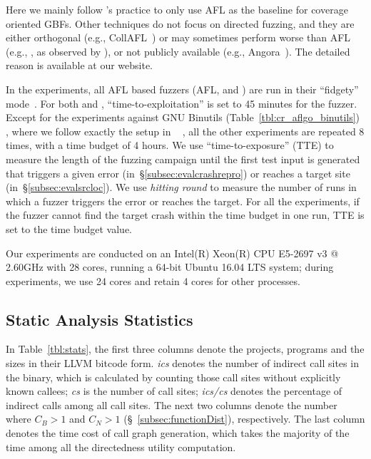 Here we mainly follow \aflgo's practice to only use AFL as the baseline for coverage oriented GBFs. Other techniques do not focus on directed fuzzing, and they are either orthogonal (e.g., CollAFL~\cite{CollAFL}) or may sometimes perform worse than AFL (e.g., \aflfast, as observed by \cite{Shastry:LNCS2017:Orthrus}), or not publicly available (e.g., Angora~\cite{Angora}). The detailed reason is available at our website. %

In the experiments, all AFL based fuzzers (AFL, {\aflgo} and {\dGO}) are run in their ``fidgety'' mode~\cite{FidgetyAFL}. For both {\aflgo} and {\dGO}, ``time-to-exploitation'' is set to 45 minutes for the fuzzer. Except for the experiments against GNU Binutils (Table~\ref{tbl:cr_aflgo_binutils}) , where we follow exactly the setup in {\aflgo}~\cite{Bohme:2017:DGF} , all the other experiments are repeated 8 times, with a time budget of 4 hours. 
We use ``time-to-exposure'' (TTE) to measure the length of the
fuzzing campaign until the first test input is generated that triggers a given error (in~\S\ref{subsec:evalcrashrepro}) or reaches a target site (in~\S\ref{subsec:evalsrcloc}).
We use \emph{hitting round} to measure the number of runs in which a fuzzer triggers the error or reaches the target.
For all the experiments, if the fuzzer cannot find the target crash within the time budget in one run, TTE is set to the time budget value. 

Our experiments are conducted on an Intel(R) Xeon(R) CPU E5-2697 v3 @ 2.60GHz with 28 cores, running a 64-bit Ubuntu 16.04 LTS system; during experiments, we use 24 cores and retain 4 cores for other processes. 


\subsection{Static Analysis Statistics}\label{subsec:evalstatic}


In Table~\ref{tbl:stats}, the first three columns denote the projects, programs and the sizes in their LLVM bitcode form. \emph{ics} denotes the number of indirect call sites in the binary, which is calculated by counting those call sites without explicitly known callees; \emph{cs} is the number of call sites; \emph{ics/cs} denotes the percentage of indirect calls among all call sites. 
The next two columns denote the number where $C_B>1$ and $C_N>1$ (\S~\ref{subsec:functionDist}), respectively. The last column denotes the time cost of call graph generation, which takes the majority of the time among all the directedness utility computation.



